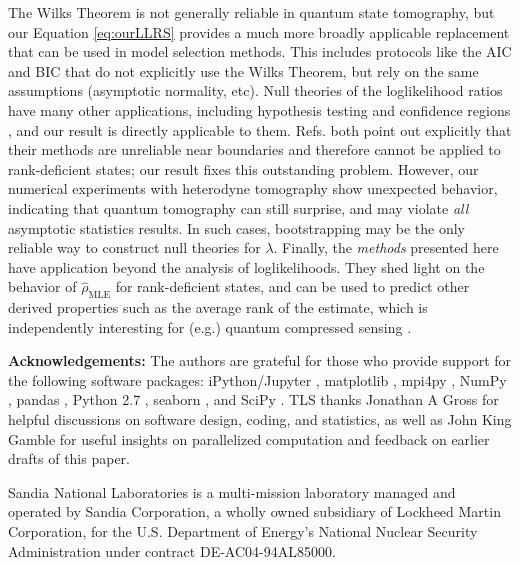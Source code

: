 \documentclass[aps,pra, twocolumn]{revtex4}
\newcommand{\rhohat}{\hat{\rho}}
\newcommand{\rhoMLE}{\rhohat_{\scriptscriptstyle\mathrm{MLE}}}
\begin{document}
The Wilks Theorem is not generally reliable in quantum state tomography, but our Equation \eqref{eq:ourLLRS} provides a much more broadly applicable replacement that can be used in model selection methods.  This includes protocols like the AIC and BIC \cite{Akaike1974, Schwarz1978, Burnham2004} that do not explicitly use the Wilks Theorem, but rely on the same assumptions (asymptotic normality, etc).  Null theories of the loglikelihood ratios have many other applications, including hypothesis testing \cite{Blume-Kohout2010,Moroder2013} and confidence regions \cite{Glancy2012a}, and our result is directly applicable to them.  Refs. \cite{Moroder2013,Glancy2012a} both point out explicitly that their methods are unreliable near boundaries and therefore cannot be applied to rank-deficient states; our result fixes this outstanding problem.  However, our numerical experiments with heterodyne tomography show unexpected behavior, indicating that quantum tomography can still surprise, and may violate \emph{all} asymptotic statistics results.  In such cases, bootstrapping \cite{Efron1979} may be the only reliable way to construct null theories for $\lambda$.  Finally, the \emph{methods} presented here have application beyond the analysis of loglikelihoods.  They shed light on the behavior of $\rhoMLE$ for rank-deficient states, and can be used to predict other derived properties such as the average rank of the estimate, which is independently interesting for (e.g.) quantum compressed sensing \cite{Flammia2012a, Kalev2015, Kalev2015a}.

\noindent\textbf{Acknowledgements:} The authors are grateful for those who provide support for the following software packages: iPython/Jupyter \cite{Perez}, matplotlib
\cite{Hunter2007}, mpi4py \cite{Dalcin2005},  NumPy \cite{VanDerWalt2011}, pandas \cite{mckinney2010}, Python 2.7 
\cite{vanRossum}, seaborn \cite{Waskom2016}, and SciPy \cite{Oliphant2007a}. TLS thanks Jonathan A Gross for helpful 
discussions on software design, coding, and statistics, as well as John King Gamble for useful insights on parallelized 
computation and feedback on earlier drafts of this paper.

Sandia National Laboratories is a multi-mission laboratory managed and operated by Sandia Corporation, a wholly owned 
subsidiary of Lockheed Martin Corporation, for the U.S. Department of Energy's National Nuclear Security Administration 
under contract DE-AC04-94AL85000.



\end{document}
